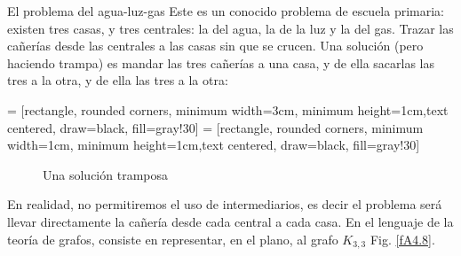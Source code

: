 \begin{section}{El problema del agua-luz-gas}\label{Ap4.2} Este es un conocido problema de escuela primaria: existen tres casas, y tres centrales: la del agua, la de la luz y la del gas. Trazar las cañerías desde las centrales a las casas sin que se crucen. Una solución (pero haciendo trampa) es mandar las tres cañerías a una casa, y de ella sacarlas las tres a la otra, y de ella las tres a la otra:

     = [rectangle, rounded corners, minimum width=3cm, minimum height=1cm,text centered, draw=black, fill=gray!30]
     = [rectangle, rounded corners, minimum width=1cm, minimum height=1cm,text centered, draw=black, fill=gray!30]
 
\begin{figure}[ht]
    \begin{center}
    \end{center}
    \caption{Una solución tramposa} \label{fA4.7}
\end{figure}

En realidad, no permitiremos el uso de intermediarios, es decir el problema será llevar directamente la cañería desde cada central a cada casa. En el lenguaje de la teoría de grafos, consiste en representar, en el plano, al grafo $K_{3,3}$ Fig. \ref{fA4.8}.


\end{section}
